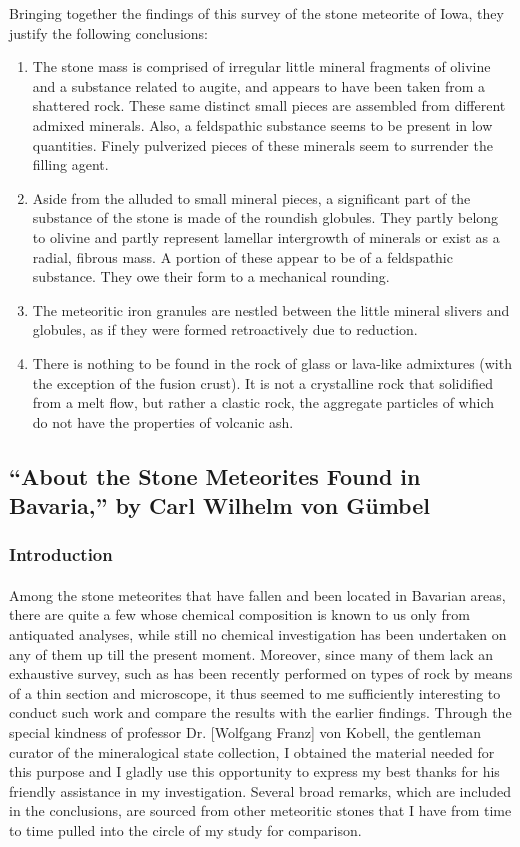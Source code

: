 \documentclass[a4paper, 12pt, oneside]{article}
\begin{document}
Bringing together the findings of this survey of the stone meteorite of Iowa, they justify the following conclusions:
\begin{enumerate}
    \item The stone mass is comprised of irregular little mineral fragments of olivine and a substance related to augite, and appears to have been taken from a shattered rock. These same distinct small pieces are assembled from different admixed minerals. Also, a feldspathic substance seems to be present in low quantities. Finely pulverized pieces of these minerals seem to surrender the filling agent.
    \item Aside from the alluded to small mineral pieces, a significant part of the substance of the stone is made of the roundish globules. They partly belong to olivine and partly represent lamellar intergrowth of minerals or exist as a radial, fibrous mass. A portion of these appear to be of a feldspathic substance. They owe their form to a mechanical rounding.
    \item The meteoritic iron granules are nestled between the little mineral slivers and globules, as if they were formed retroactively due to reduction.
    \item There is nothing to be found in the rock of glass or lava-like admixtures (with the exception of the fusion crust). It is not a crystalline rock that solidified from a melt flow, but rather a clastic rock, the aggregate particles of which do not have the properties of volcanic ash.
\end{enumerate}
\clearpage
\subsection{``About the Stone Meteorites Found in Bavaria,'' by Carl Wilhelm von Gümbel}
\subsubsection*{Introduction}
\paragraph*{}
Among the stone meteorites that have fallen and been located in Bavarian areas, there are quite a few whose chemical composition is known to us only from antiquated analyses, while still no chemical investigation has been undertaken on any of them up till the present moment. Moreover, since many of them lack an exhaustive survey, such as has been recently performed on types of rock by means of a thin section and microscope, it thus seemed to me sufficiently interesting to conduct such work and compare the results with the earlier findings. Through the special kindness of professor Dr. [Wolfgang Franz] von Kobell, the gentleman curator of the mineralogical state collection, I obtained the material needed for this purpose and I gladly use this opportunity to express my best thanks for his friendly assistance in my investigation. Several broad remarks, which are included in the conclusions, are sourced from other meteoritic stones that I have from time to time pulled into the circle of my study for comparison.
\end{document}
